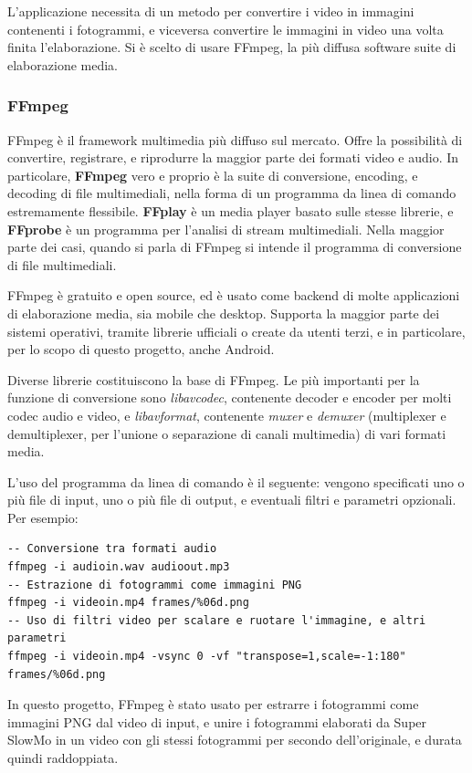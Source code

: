L'applicazione necessita di un metodo per convertire i video in immagini contenenti i
fotogrammi, e viceversa convertire le immagini in video una volta finita l'elaborazione.
Si è scelto di usare FFmpeg, la più diffusa software suite di elaborazione media.

\subsubsection*{FFmpeg}

FFmpeg\cite{sito_ffmpeg} è il framework multimedia più diffuso sul mercato. Offre la possibilità di convertire, 
registrare, e riprodurre la maggior parte dei formati video e audio. In particolare, 
\textbf{FFmpeg} vero e proprio è la suite di conversione, encoding, e decoding di file
multimediali, nella forma di un programma da linea di comando estremamente flessibile.
\textbf{FFplay} è un media player basato sulle stesse librerie, e \textbf{FFprobe} è un
programma per l'analisi di stream multimediali. Nella maggior parte dei casi, quando si
parla di FFmpeg si intende il programma di conversione di file multimediali.

FFmpeg è gratuito e open source, ed è usato come backend di molte applicazioni di elaborazione
media, sia mobile che desktop. Supporta la maggior parte dei sistemi operativi, tramite librerie
ufficiali o create da utenti terzi, e in particolare, per lo scopo di questo progetto, anche
Android. 

Diverse librerie costituiscono la base di FFmpeg. Le più importanti per la funzione di
conversione sono \emph{libavcodec}, contenente decoder e encoder per molti codec audio e video, 
e \emph{libavformat}, contenente \emph{muxer} e \emph{demuxer} (multiplexer e demultiplexer, 
per l'unione o separazione di canali multimedia) di vari formati media.

L'uso del programma da linea di comando è il seguente: vengono specificati uno o più file di 
input, uno o più file di output, e eventuali filtri e parametri opzionali. Per esempio:

\begin{verbatim}
-- Conversione tra formati audio
ffmpeg -i audioin.wav audioout.mp3
-- Estrazione di fotogrammi come immagini PNG
ffmpeg -i videoin.mp4 frames/%06d.png
-- Uso di filtri video per scalare e ruotare l'immagine, e altri parametri
ffmpeg -i videoin.mp4 -vsync 0 -vf "transpose=1,scale=-1:180" frames/%06d.png
\end{verbatim}

In questo progetto, FFmpeg è stato usato per estrarre i fotogrammi come immagini PNG dal video
di input, e unire i fotogrammi elaborati da Super SlowMo in un video con gli stessi fotogrammi
per secondo dell'originale, e durata quindi raddoppiata.

